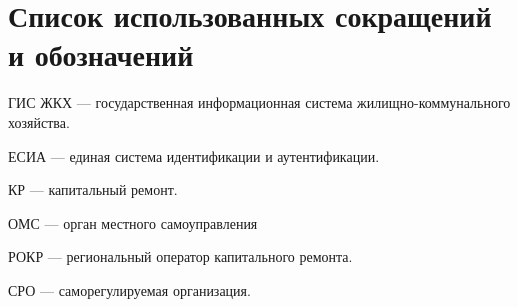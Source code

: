 \section*{Список использованных сокращений и обозначений}

ГИС ЖКХ --- государственная информационная система жи\-лищ\-но-ком\-му\-наль\-ного хозяйства.

ЕСИА --- единая система идентификации и аутентификации.

КР --- капитальный ремонт.

ОМС --- орган местного самоуправления

РОКР --- региональный оператор капитального ремонта.

СРО --- саморегулируемая организация.

\clearpage
\newpage
